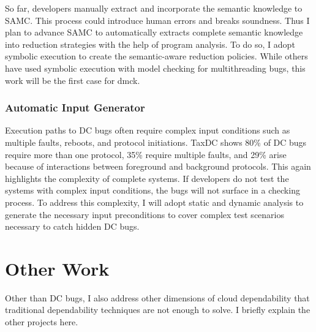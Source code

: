 \documentclass[10pt]{article}
\begin{document}
So far, developers manually extract and incorporate the semantic knowledge to
SAMC. This process could introduce human errors and breaks soundness. Thus I
plan to advance SAMC to automatically extracts complete semantic knowledge into
reduction strategies with the help of program analysis. To do so, I adopt
symbolic execution to create the semantic-aware reduction policies. While others
have used symbolic execution with model checking for multithreading bugs, this
work will be the first case for dmck. 

\subsubsection*{Automatic Input Generator}

Execution paths to DC bugs often require complex input conditions such as
multiple faults, reboots, and protocol initiations. TaxDC shows 80\% of DC bugs
require more than one protocol, 35\% require multiple faults, and 29\% arise
because of interactions between foreground and background protocols. This again
highlights the complexity of complete systems. 
If developers do not test the systems with complex input conditions, the bugs
will not surface in a checking process. To address this complexity, I will adopt
static and dynamic analysis to generate the necessary input preconditions to
cover complex test scenarios necessary to catch hidden DC bugs.

\section{Other Work}

Other than DC bugs, I also address other dimensions of cloud dependability that
traditional dependability techniques are not enough to solve. I briefly explain
the other projects here.

%

\end{document}
